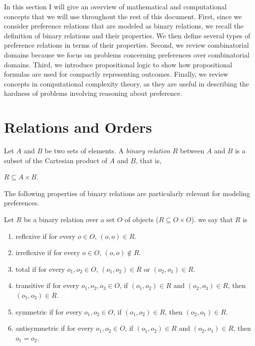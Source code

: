 
In this section I will give an overview of
mathematical and computational concepts
that we will use throughout the rest of this document. 
First, since we consider preference relations that are modeled
as binary relations,
we recall the definition of binary relations and their
properties.
We then define several types of preference relations in terms of
their properties.
Second, we review combinatorial domains because we focus on
problems concerning preferences over combinatorial domains.
Third, we introduce propositional logic to show how propositional
formulas are used for compactly representing outcomes.
Finally, we review concepts in computational complexity theory,
as they are useful in describing the hardness of problems
involving reasoning about preference.

\section{Relations and Orders \label{sec:relations}}


\begin{definition}
	Let $A$ and $B$ be two sets of elements.  A \textit{binary relation} $R$ between $A$ and $B$
	is a subset of the Cartesian product of $A$ and $B$, that is,
	\begin{center}
		$R \subseteq A \times B$.
	\end{center}
\end{definition}


The following properties of binary relations are particularly relevant for modeling preferences.
\begin{definition}
	Let $R$ be a binary relation over a set $O$ of objects ($R \subseteq O \times O$).
	we say that $R$ is
	\begin{enumerate} \itemsep -4pt
		\item reflexive if for every $o \in O$, $(o,o) \in R$.
		\item irreflexive if for every $o \in O$, $(o,o) \not \in R$.
		\item total if for every $o_1,o_2 \in O$, $(o_1,o_2) \in R$ or $(o_2,o_1) \in R$.
		\item transitive if for every $o_1,o_2,o_3 \in O$, if $(o_1,o_2) \in R$ and $(o_2,o_3) \in R$, 
					then $(o_1,o_3) \in R$.
		\item symmetric if for every $o_1,o_2 \in O$, if $(o_1,o_2) \in R$, then $(o_2,o_1) \in R$.
		\item antisymmetric if for every $o_1,o_2 \in O$, if $(o_1,o_2) \in R$ and $(o_2,o_1) \in R$, then $o_1=o_2$.
	\end{enumerate}
\end{definition}

